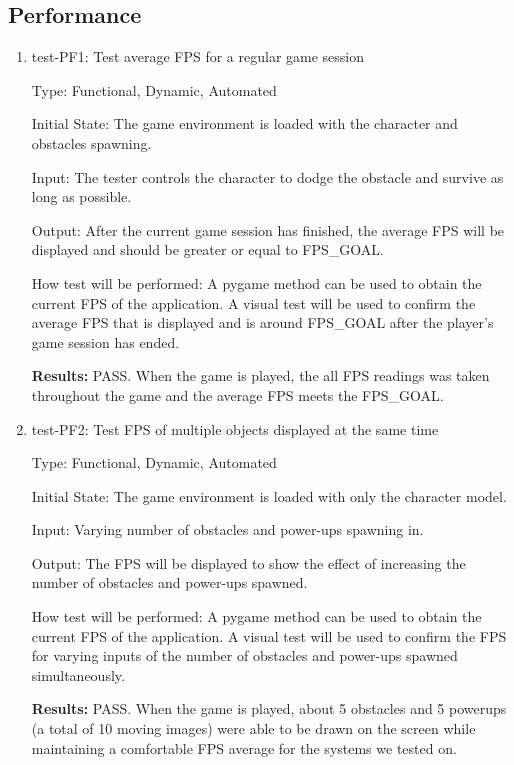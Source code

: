 \documentclass[12pt, titlepage]{article}
\begin{document}
\subsection{Performance}
\begin{enumerate}
\item{test-PF1: Test average FPS for a regular game session\\}

Type: Functional, Dynamic, Automated
					
Initial State: The game environment is loaded with the character and obstacles spawning.

Input: The tester controls the character to dodge the obstacle and survive as long as possible.
					
Output: After the current game session has finished, the average FPS will be displayed and should be greater or equal to FPS\_GOAL.
					
How test will be performed: A pygame method can be used to obtain the current FPS of the application. A visual test will be used to confirm the average FPS that is displayed and is around FPS\_GOAL after the player's game session has ended.

\textbf{Results:} PASS. When the game is played, the all FPS readings was taken throughout the game and the average FPS meets the FPS\_GOAL.

\item{test-PF2: Test FPS of multiple objects displayed at the same time\\}

Type: Functional, Dynamic, Automated
					
Initial State: The game environment is loaded with only the character model.

Input: Varying number of obstacles and power-ups spawning in.
					
Output: The FPS will be displayed to show the effect of increasing the number of obstacles and power-ups spawned.
					
How test will be performed: A pygame method can be used to obtain the current FPS of the application. A visual test will be used to confirm the FPS for varying inputs of the number of obstacles and power-ups spawned simultaneously. 

\textbf{Results:} PASS. When the game is played, about 5 obstacles and 5 powerups (a total of 10 moving images) were able to be drawn on the screen while maintaining a comfortable FPS average for the systems we tested on.


\end{enumerate}
\end{document}
